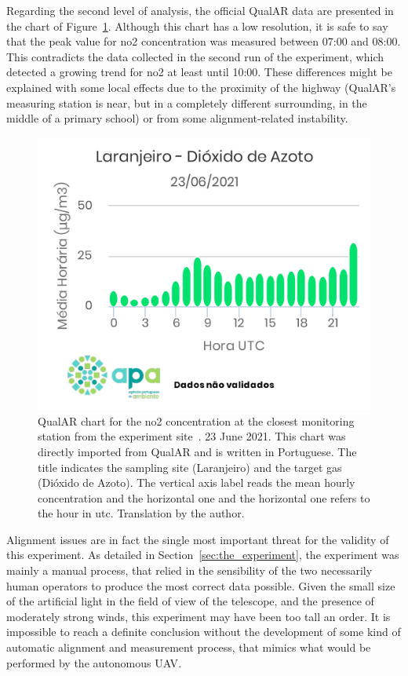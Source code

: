 Regarding the second level of analysis, the official QualAR data are
presented in the chart of Figure~\ref{fig:qualar_2306}. Although this
chart has a low resolution, it is safe to say that the peak value for
\gls{no2} concentration was measured between 07:00 and 08:00. This
contradicts the data collected in the second run of the experiment,
which detected a growing trend for \gls{no2} at least until 10:00. These
differences might be explained with some local effects due to the
proximity of the highway (QualAR's measuring station is near, but in a
completely different surrounding, in the middle of a primary school) or
from some alignment-related instability. 

\begin{figure}[htpb]
    \centering
    \includegraphics[width=0.8\linewidth]{img/pdf/no2_23jun_apa_chart.pdf}
    \caption{QualAR chart for the \gls{no2} concentration at
    the closest monitoring station from the experiment
    site~\cite{Ambiente2019}. 23 June 2021. This chart was directly
    imported from QualAR and is written in Portuguese. The title indicates
    the sampling site (Laranjeiro) and the target gas (Dióxido de Azoto).
    The vertical axis label reads the mean hourly concentration and the
    horizontal one and the horizontal one refers to the hour in \gls{utc}.
    Translation by the author.}
    \label{fig:qualar_2306}
\end{figure}

Alignment issues are in fact the single most important threat for the
validity of this experiment. As detailed in
Section~\ref{sec:the_experiment}, the experiment was mainly a manual
process, that relied in the sensibility of the two necessarily human
operators to produce the most correct data possible. Given the small
size of the artificial light in the field of view of the telescope, and
the presence of moderately strong winds, this experiment may have been
too tall an order. It is impossible to reach a definite conclusion
without the development of some kind of automatic alignment and
measurement process, that mimics what would be performed by the
autonomous \gls{UAV}.

